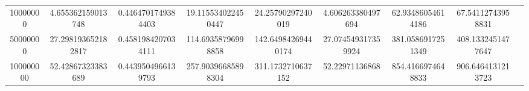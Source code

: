 \begin{table}[ht]
{\begin{tabular}{@{}S[table-format=9]SSSSSSSS@{}}
            10000000            & 4.655362159013748   & 0.4464701749384403 & 19.115534022450447 & 24.25790297240019  & 4.606263380497694  & 62.93486054614186  & 67.54112743958831  \\
            50000000            & 27.298193652182817  & 0.4581984207034111 & 114.69358796998858 & 142.64984269440174 & 27.074549317359924 & 381.0586917251349  & 408.1332451477647  \\
            100000000           & 52.42867323383689   & 0.4439504966139793 & 257.90396685898304 & 311.1732710637152  & 52.22971136868     & 854.4166974648833  & 906.6464131213723  \\
            \bottomrule
        \end{tabular}\label{table:efficiency_csv-70percent}
    }
\end{table}